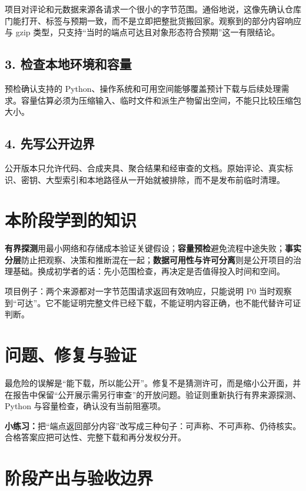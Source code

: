 项目对评论和元数据来源各请求一个很小的字节范围。通俗地说，这像先确认仓库门能打开、标签与预期一致，而不是立即把整批货搬回家。观察到的部分内容响应与 gzip 类型，只支持“当时的端点可达且对象形态符合预期”这一有限结论。

\subsection{3. 检查本地环境和容量}

预检确认支持的 Python、操作系统和可用空间能够覆盖预计下载与后续处理需求。容量估算必须为压缩输入、临时文件和派生产物留出空间，不能只比较压缩包大小。

\subsection{4. 先写公开边界}

公开版本只允许代码、合成夹具、聚合结果和经审查的文档。原始评论、真实标识、密钥、大型索引和本地路径从一开始就被排除，而不是发布前临时清理。

\section{本阶段学到的知识}

\textbf{有界探测}用最小网络和存储成本验证关键假设；\textbf{容量预检}避免流程中途失败；\textbf{事实分层}防止把观察、决策和推断混在一起；\textbf{数据可用性与许可分离}则是公开项目的治理基础。换成初学者的话：先小范围检查，再决定是否值得投入时间和空间。

\begin{beginnerbox}
项目例子：两个来源都对一字节范围请求返回有效响应，只能说明 P0 当时观察到“可达”。它不能证明完整文件已经下载，不能证明内容正确，也不能代替许可证判断。
\end{beginnerbox}

\section{问题、修复与验证}

最危险的误解是“能下载，所以能公开”。修复不是猜测许可，而是缩小公开面，并在报告中保留“公开展示需另行审查”的开放问题。验证则重新执行有界来源探测、Python 与容量检查，确认没有当前阻塞项。

\textbf{小练习：}把“端点返回部分内容”改写成三种句子：可声称、不可声称、仍待核实。合格答案应把可达性、完整下载和再分发权分开。

\section{阶段产出与验收边界}

